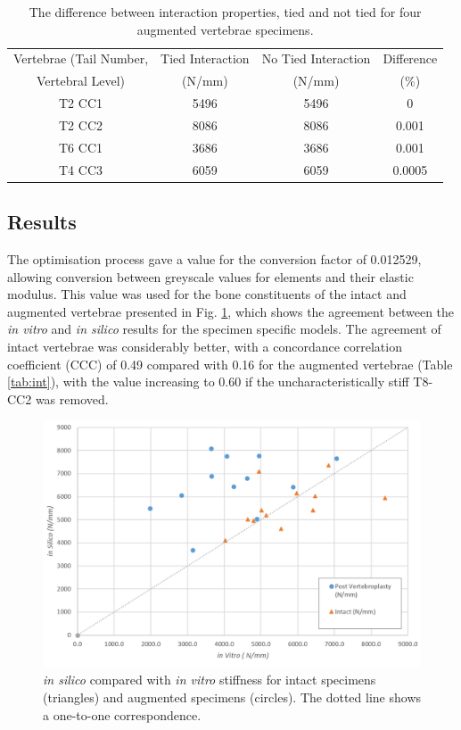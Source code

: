 \begin{table}[ht!]

\caption{The difference between interaction properties, tied and not tied for
four augmented vertebrae specimens.}
\label{tab:meshint}
\centering
  \begin{tabular}{c|c|c|c}
Vertebrae (Tail Number,  & Tied Interaction  & No Tied Interaction  &
Difference \\
Vertebral Level) & (N/mm) & (N/mm) & (\%) \\
\hline
\hline

T2 CC1 &	 5496 &	 5496 &	 0\\
T2 CC2 &	 8086 &	 8086 &	 0.001\\
T6 CC1 &	 3686 &	 3686 &	 0.001\\
T4 CC3 &	 6059 &	 6059 &	 0.0005\\ \hline

\end{tabular}
\end{table}


\subsection{Results}

The optimisation process gave a value for the conversion factor of 0.012529, allowing conversion between greyscale values for elements and their elastic modulus. This value was used for the bone constituents of the intact and augmented vertebrae presented in Fig. \ref{fig:compvexpscatter}, which shows the agreement between the \textit{in vitro} and \textit{in silico} results for the specimen specific models. The agreement of intact vertebrae was considerably better, with a concordance
correlation coefficient (CCC) of 0.49 compared with 0.16 for the augmented vertebrae (Table \ref{tab:int}), with the value increasing to 0.60 if the uncharacteristically stiff T8-CC2 was removed.

\begin{figure}[ht]
\centering
\includegraphics[width=\textwidth]{images/exp_vs_comp_both.png}
\caption{\textit{in silico} compared with \textit{in vitro} stiffness for intact specimens (triangles) and augmented specimens (circles). The dotted line shows a one-to-one correspondence.}
\label{fig:compvexpscatter}
\end{figure}

